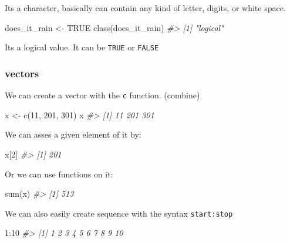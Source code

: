 \documentclass[
]{article}
\newenvironment{Shaded}{\begin{snugshade}}{\end{snugshade}}
\newcommand{\CommentTok}[1]{\textcolor[rgb]{0.56,0.35,0.01}{\textit{#1}}}
\newcommand{\ConstantTok}[1]{\textcolor[rgb]{0.00,0.00,0.00}{#1}}
\newcommand{\DecValTok}[1]{\textcolor[rgb]{0.00,0.00,0.81}{#1}}
\newcommand{\FunctionTok}[1]{\textcolor[rgb]{0.00,0.00,0.00}{#1}}
\newcommand{\NormalTok}[1]{#1}
\newcommand{\OtherTok}[1]{\textcolor[rgb]{0.56,0.35,0.01}{#1}}
\newcommand{\SpecialCharTok}[1]{\textcolor[rgb]{0.00,0.00,0.00}{#1}}
\begin{document}
Its a character, basically can contain any kind of letter, digits, or white space.

\begin{Shaded}
\begin{Highlighting}[]
\NormalTok{does\_it\_rain }\OtherTok{\textless{}{-}} \ConstantTok{TRUE}
\FunctionTok{class}\NormalTok{(does\_it\_rain)}
\CommentTok{\#\textgreater{} [1] "logical"}
\end{Highlighting}
\end{Shaded}

Its a logical value. It can be \texttt{TRUE} or \texttt{FALSE}

\hypertarget{vectors}{%
\subsubsection{vectors}\label{vectors}}

We can create a vector with the \texttt{c} function. (combine)

\begin{Shaded}
\begin{Highlighting}[]
\NormalTok{x }\OtherTok{\textless{}{-}} \FunctionTok{c}\NormalTok{(}\DecValTok{11}\NormalTok{, }\DecValTok{201}\NormalTok{, }\DecValTok{301}\NormalTok{)}
\NormalTok{x}
\CommentTok{\#\textgreater{} [1]  11 201 301}
\end{Highlighting}
\end{Shaded}

We can asses a given element of it by:

\begin{Shaded}
\begin{Highlighting}[]
\NormalTok{x[}\DecValTok{2}\NormalTok{]}
\CommentTok{\#\textgreater{} [1] 201}
\end{Highlighting}
\end{Shaded}

Or we can use functions on it:

\begin{Shaded}
\begin{Highlighting}[]
\FunctionTok{sum}\NormalTok{(x)}
\CommentTok{\#\textgreater{} [1] 513}
\end{Highlighting}
\end{Shaded}

We can also easily create sequence with the syntax \texttt{start:stop}

\begin{Shaded}
\begin{Highlighting}[]
\DecValTok{1}\SpecialCharTok{:}\DecValTok{10}
\CommentTok{\#\textgreater{}  [1]  1  2  3  4  5  6  7  8  9 10}
\end{Highlighting}
\end{Shaded}
\end{document}
